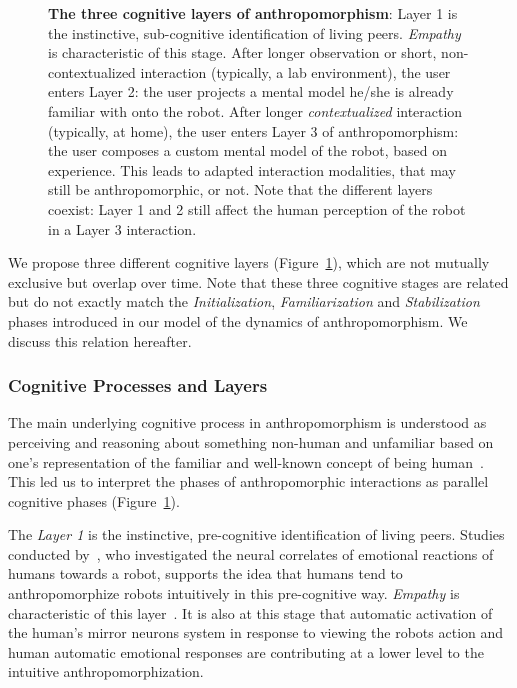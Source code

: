 \documentclass{frontiersSCNS} %
\begin{document}
\begin{figure}[htb]
\begin{tikzpicture}
\end{tikzpicture}
\caption{\textbf{The three cognitive layers of anthropomorphism}: Layer 1 is the instinctive,
sub-cognitive identification of living peers. {\it Empathy} is characteristic
of this stage. After longer observation or short, non-contextualized interaction
(typically, a lab environment), the user enters Layer 2: the user projects a
mental model he/she is already familiar with onto the robot. After longer {\it
contextualized} interaction (typically, at home), the user enters Layer 3 of
anthropomorphism: the user composes a custom mental model of the robot,
based on experience. This leads to adapted interaction modalities, that may
still be anthropomorphic, or not. Note that the different layers coexist: Layer
1 and 2 still affect the human perception of the robot in a Layer 3 interaction.}
\label{fig:cognitivemodel}
\end{figure}

We propose three different cognitive layers (Figure~\ref{fig:cognitivemodel}),
which are not mutually exclusive but overlap over time. Note that these three
cognitive stages are related but do not exactly match the \emph{Initialization},
\emph{Familiarization} and \emph{Stabilization} phases introduced in our model
of the dynamics of anthropomorphism. We discuss this relation hereafter.


\subsubsection{Cognitive Processes and Layers\\}

The main underlying cognitive process in anthropomorphism is understood as
perceiving and reasoning about something non-human and unfamiliar based on one's
representation of the familiar and well-known concept of being
human~\citep{epley_when_2008}. This led us to interpret the phases of
anthropomorphic interactions as parallel cognitive phases
(Figure~\ref{fig:cognitivemodel}).

The \emph{Layer 1} is the instinctive, pre-cognitive identification of living
peers. Studies conducted by~\citet{rosenthal-vonderputten_experimental_2013},
who investigated the neural correlates of emotional reactions of humans towards
a robot, supports the idea that humans tend to anthropomorphize robots
intuitively in this pre-cognitive way. {\it Empathy} is characteristic of this
layer~\citep{rosenthalvonderPutten2013neural}.  It is also at this stage that
automatic activation of the human's mirror neurons system  in response to
viewing the robots action and human automatic emotional responses are
contributing at a lower level to the intuitive anthropomorphization.
\end{document}
